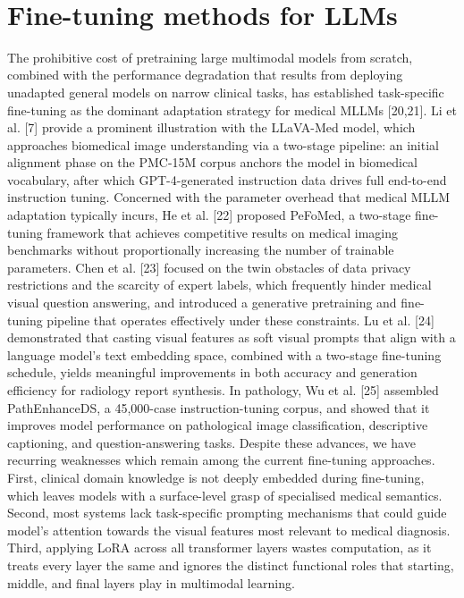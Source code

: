 ﻿﻿\documentclass[12pt]{report}
\begin{document}
\section{Fine-tuning methods for LLMs}
The prohibitive cost of pretraining large multimodal models from scratch, combined with the performance degradation that results from deploying unadapted general models on narrow clinical tasks, has established task-specific fine-tuning as the dominant adaptation strategy for medical MLLMs [20,21]. Li et al. [7] provide a prominent illustration with the LLaVA-Med model, which approaches biomedical image understanding via a two-stage pipeline: an initial alignment phase on the PMC-15M corpus anchors the model in biomedical vocabulary, after which GPT-4-generated instruction data drives full end-to-end instruction tuning. Concerned with the parameter overhead that medical MLLM adaptation typically incurs, He et al. [22] proposed PeFoMed, a two-stage fine-tuning framework that achieves competitive results on medical imaging benchmarks without proportionally increasing the number of trainable parameters. Chen et al. [23] focused on the twin obstacles of data privacy restrictions and the scarcity of expert labels, which frequently hinder medical visual question answering, and introduced a generative pretraining and fine-tuning pipeline that operates effectively under these constraints. Lu et al. [24] demonstrated that casting visual features as soft visual prompts that align with a language model's text embedding space, combined with a two-stage fine-tuning schedule, yields meaningful improvements in both accuracy and generation efficiency for radiology report synthesis. In pathology, Wu et al. [25] assembled PathEnhanceDS, a 45,000-case instruction-tuning corpus, and showed that it improves model performance on pathological image classification, descriptive captioning, and question-answering tasks. Despite these advances, we have recurring weaknesses which remain among the current fine-tuning approaches. First, clinical domain knowledge is not deeply embedded during fine-tuning, which leaves models with a surface-level grasp of specialised medical semantics. Second, most systems lack task-specific prompting mechanisms that could guide model's attention towards the visual features most relevant to medical diagnosis. Third, applying LoRA across all transformer layers wastes computation, as it treats every layer the same and ignores the distinct functional roles that starting, middle, and final layers play in multimodal learning.
\end{document}
